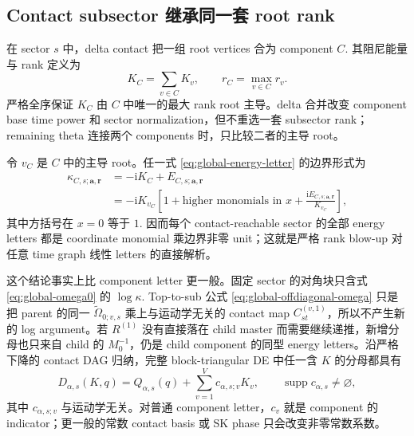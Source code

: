 \documentclass[11pt,a4paper]{ctexart}
\newcommand{\ii}{\mathrm i}
\begin{document}
\subsection{Contact subsector 继承同一套 root rank}

在 sector $s$ 中，delta contact 把一组 root vertices 合为 component $C$. 其阻尼能量与 rank 定义为
\begin{equation}
 K_C=\sum_{v\in C}K_v,
 \qquad
 r_C=\max_{v\in C}r_v.
 \label{eq:component-energy-rank}
\end{equation}
严格全序保证 $K_C$ 由 $C$ 中唯一的最大 rank root 主导。delta 合并改变 component base time power 和 sector normalization，但不重选一套 subsector rank；remaining theta 连接两个 components 时，只比较二者的主导 root。

令 $v_C$ 是 $C$ 中的主导 root。任一式 \eqref{eq:global-energy-letter} 的边界形式为
\begin{equation}
 \begin{split}
 \kappa_{C,s;\bm a,\bm r}
 &=-\ii K_C+E_{C,s;\bm a,\bm r}\\
 &=-\ii K_{v_C}
 \left[1+\text{higher monomials in }x
 +\frac{\ii E_{C,s;\bm a,\bm r}}{K_{v_C}}\right],
 \end{split}
 \label{eq:boundary-letter-unit}
\end{equation}
其中方括号在 $x=0$ 等于 $1$. 因而每个 contact-reachable sector 的全部 energy letters 都是 coordinate monomial 乘边界非零 unit；这就是严格 rank blow-up 对任意 time graph 线性 letters 的直接解析。

这个结论事实上比 component letter 更一般。固定 sector 的对角块只含式 \eqref{eq:global-omega0} 的 $\log\kappa$. Top-to-sub 公式 \eqref{eq:global-offdiagonal-omega} 只是把 parent 的同一 $\widetilde\Omega_{0;v,s}$ 乘上与运动学无关的 contact map $C_{st}^{(v,1)}$，所以不产生新的 log argument。若 $R^{(1)}$ 没有直接落在 child master 而需要继续递推，新增分母也只来自 child 的 $M_0^{-1}$，仍是 child component 的同型 energy letters。沿严格下降的 contact DAG 归纳，完整 block-triangular DE 中任一含 $K$ 的分母都具有
\begin{equation}
 D_{\alpha,s}(K,q)
 =Q_{\alpha,s}(q)
 +\sum_{v=1}^{V}c_{\alpha,s;v}K_v,
 \qquad
 \operatorname{supp}c_{\alpha,s}\neq\varnothing,
 \label{eq:general-affine-K-divisor}
\end{equation}
其中 $c_{\alpha,s;v}$ 与运动学无关。对普通 component letter，$c_v$ 就是 component 的 indicator；更一般的常数 contact basis 或 SK phase 只会改变非零常数系数。
\end{document}
